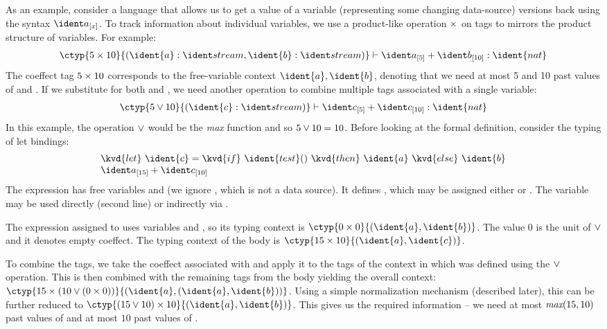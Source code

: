 As an example, consider a language that allows us to get a value of a variable (representing
some changing data-source)  versions back using the syntax $\pastval{a}{x}$. 
To track information about individual variables, we use a product-like operation $\times$ on tags 
to mirrors the product structure of variables. For example:
%
\begin{equation*}
\begin{array}{l}
\ctyp{5 \csprd 10}{(\ident{a}:\dnat, \ident{b}:\dnat)}
  \vdash
    \pastval{a}{5}+\pastval{b}{10}: \ident{nat}
\end{array}
\end{equation*}
%
The coeffect tag $5 \times 10$ corresponds to the free-variable context $\ident{a}, \ident{b}$, denoting
that we need at most 5 and 10 past values of  and . If we substitute 
for both  and , we need another operation to combine multiple tags associated with 
a single variable:
%
\begin{equation*}
\begin{array}{l}
\ctyp{5 \csvop 10}{(\ident{c}:\dnat)}
  \vdash
    \pastval{c}{5}+\pastval{c}{10}: \ident{nat}
\end{array}
\end{equation*}
%
In this example, the operation $\vee$ would be the \emph{max} function and so $5 \vee 10 = 10$.
Before looking at the formal definition, consider the typing of let bindings:
%
\begin{equation*}
\begin{array}{l}
\kvd{let}~\ident{c} = \kvd{if}~\ident{test}()~\kvd{then}~\ident{a}~\kvd{else}~\ident{b}\\
\pastval{a}{15}+\pastval{c}{10}
\end{array}
\end{equation*}
%
The expression has free variables  and  (we ignore , which
is not a data source). It defines , which may be assigned either  or .
The variable  may be used directly (second line) or indirectly via .

The expression assigned to  uses variables  and , so its typing
context is $\ctyp{0 \csprd 0}{(\ident{a}, \ident{b})}$. The value $0$ is the unit
of $\vee$ and it denotes empty coeffect. The typing context of the
body is $\ctyp{15 \csprd 10}{(\ident{a}, \ident{c})}$.

To combine the tags, we take the coeffect associated with  and apply it to the tags
of the context in which  was defined using the $\vee$ operation. This is then combined 
with the remaining tags from the body yielding the overall context:
$\ctyp{15 \csprd (10 \csvop (0 \csprd 0))}{(\ident{a}, (\ident{a}, \ident{b}))}$. Using a simple
normalization mechanism (described later), this can be further reduced to
$\ctyp{(15 \csvop 10) \csprd 10}{(\ident{a}, \ident{b})}$. This gives us the required information --
we need at most $\emph{max}(15,10)$ past values of  and at most $10$ past values of 
.

